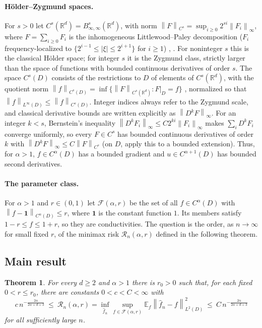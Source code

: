 \documentclass[12pt]{article}
\numberwithin{equation}{section}
\newtheorem{theorem}{Theorem}[section]
\newcommand{\R}{\mathbb R}
\newcommand{\E}{\mathbb E}
\newcommand{\norm}[1]{\left\|#1\right\|}
\begin{document}
\paragraph{H\"older--Zygmund spaces.}
For $s>0$ let $C^s(\R^d)=B^s_{\infty,\infty}(\R^d)$, with norm
$\norm F_{C^s}=\sup_{i\ge0}2^{si}\norm{F_i}_\infty$, where
$F=\sum_{i\ge0}F_i$ is the inhomogeneous Littlewood--Paley
decomposition ($F_i$ frequency-localized to
$\{2^{i-1}\le|\xi|\le2^{i+1}\}$ for $i\ge1$) \cite[Section 4.3]{GN},
\cite{Triebel}. For noninteger $s$ this is the classical H\"older
space; for integer $s$ it is the Zygmund class, strictly larger than
the space of functions with bounded continuous derivatives of order
$s$. The space $C^s(D)$ consists of the restrictions to $D$ of elements
of $C^s(\R^d)$, with the quotient norm
$\norm f_{C^s(D)}=\inf\{\norm F_{C^s(\R^d)}:F|_D=f\}$
\cite[Section 4.3.6]{GN}, normalized so that
$\norm f_{L^\infty(D)}\le\norm f_{C^s(D)}$. Integer indices always
refer to the Zygmund scale, and classical derivative bounds are written
explicitly as $\norm{D^kF}_\infty$. For an integer $k<s$, Bernstein's
inequality $\norm{D^kF_i}_\infty\le C2^{ki}\norm{F_i}_\infty$
\cite[Lemma 4.3.4]{GN} makes $\sum_iD^kF_i$ converge uniformly, so
every $F\in C^s$ has bounded continuous derivatives of order $k$ with
$\norm{D^kF}_\infty\le C\norm F_{C^s}$ (on $D$, apply this to a bounded
extension). Thus, for $\alpha>1$, $f\in C^\alpha(D)$ has a bounded
gradient and $u\in C^{\alpha+1}(D)$ has bounded second derivatives.

\paragraph{The parameter class.}
For $\alpha>1$ and $r\in(0,1)$ let $\mathcal F(\alpha,r)$ be the set
of all $f\in C^\alpha(D)$ with $\norm{f-\mathbf 1}_{C^\alpha(D)}\le r$,
where $\mathbf 1$ is the constant function $1$. Its members satisfy
$1-r\le f\le1+r$, so they are conductivities. The question is the order,
as $n\to\infty$ for small fixed $r$, of the minimax risk
$\mathcal R_n(\alpha,r)$ defined in the following theorem.

\subsection{Main result}

\begin{theorem}\label{thm:main}
For every $d\ge2$ and $\alpha>1$ there is $r_0>0$ such that, for each
fixed $0<r\le r_0$, there are constants $0<c<C<\infty$ with
\[
 c\,n^{-\frac{2\alpha}{2\alpha+d+3}}
 \ \le\
 \mathcal R_n(\alpha,r)
 =\inf_{\widehat f_n}\sup_{f\in\mathcal F(\alpha,r)}
 \E_f\norm{\widehat f_n-f}_{L^2(D)}^2
 \ \le\
 C\,n^{-\frac{2\alpha}{2\alpha+d+3}}
\]
for all sufficiently large $n$.
\end{theorem}
\end{document}
